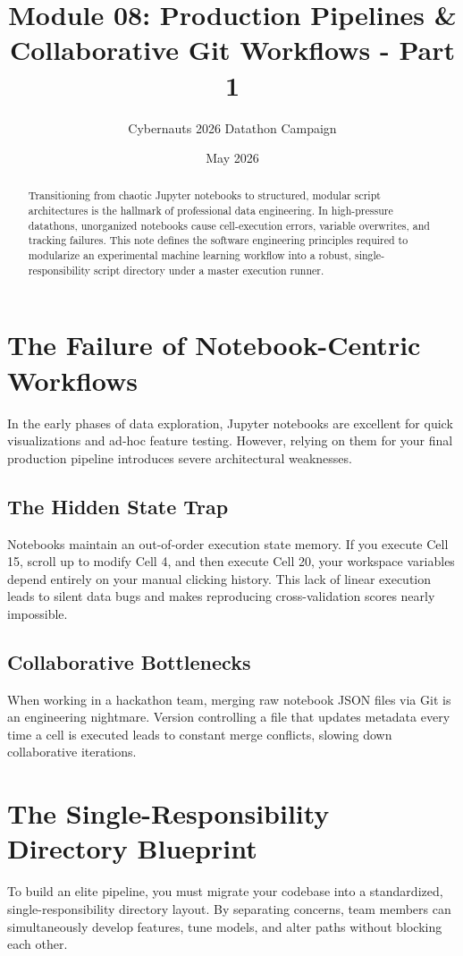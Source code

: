 \documentclass{article}
\title{Module 08: Production Pipelines \& Collaborative Git Workflows - Part 1}
\author{Cybernauts 2026 Datathon Campaign}
\date{May 2026}
\begin{document}
\maketitle

\begin{abstract}
Transitioning from chaotic Jupyter notebooks to structured, modular script architectures is the hallmark of professional data engineering. In high-pressure datathons, unorganized notebooks cause cell-execution errors, variable overwrites, and tracking failures. This note defines the software engineering principles required to modularize an experimental machine learning workflow into a robust, single-responsibility script directory under a master execution runner.
\end{abstract}

\tableofcontents
\newpage

\section{The Failure of Notebook-Centric Workflows}
In the early phases of data exploration, Jupyter notebooks are excellent for quick visualizations and ad-hoc feature testing. However, relying on them for your final production pipeline introduces severe architectural weaknesses.

\subsection{The Hidden State Trap}
Notebooks maintain an out-of-order execution state memory. If you execute Cell 15, scroll up to modify Cell 4, and then execute Cell 20, your workspace variables depend entirely on your manual clicking history. This lack of linear execution leads to silent data bugs and makes reproducing cross-validation scores nearly impossible.

\subsection{Collaborative Bottlenecks}
When working in a hackathon team, merging raw notebook JSON files via Git is an engineering nightmare. Version controlling a file that updates metadata every time a cell is executed leads to constant merge conflicts, slowing down collaborative iterations.

\section{The Single-Responsibility Directory Blueprint}
To build an elite pipeline, you must migrate your codebase into a standardized, single-responsibility directory layout. By separating concerns, team members can simultaneously develop features, tune models, and alter paths without blocking each other.
\end{document}
